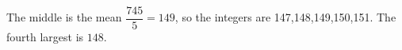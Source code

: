 The middle is the mean $\dfrac{745}{5}=149$, so the integers are 147,148,149,150,151. The fourth largest is $\boxed{148}$.
